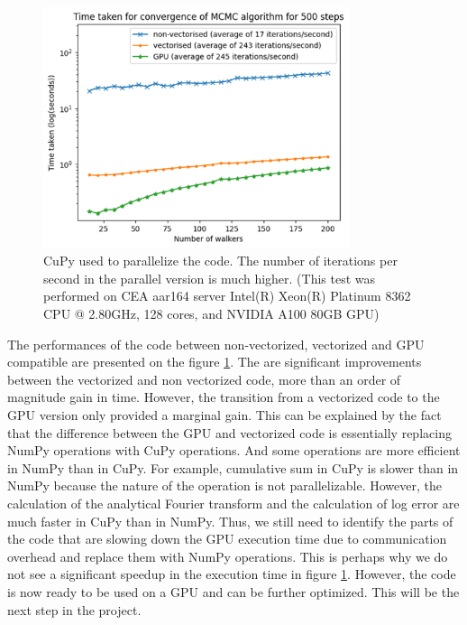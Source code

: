 \begin{figure}[h]
    \centering
    \includegraphics[width=0.8\textwidth]{images/gpu.png}
    \caption{CuPy used to parallelize the code. The number of iterations per second in the parallel version is much higher. (This test was performed 
    on CEA aar164 server Intel(R) Xeon(R) Platinum 8362 CPU @ 2.80GHz, 128 cores, and NVIDIA A100 80GB GPU)}
    \label{fig:cupy}
\end{figure}

\FloatBarrier

The performances of the code between non-vectorized, vectorized and GPU compatible are presented on the figure
\ref{fig:cupy}. The are significant improvements between the vectorized and non vectorized code, more than an order of magnitude gain in time.
However, the transition from a vectorized code to the GPU version only provided a marginal gain.
This can be explained by the fact that the difference between the GPU and vectorized code is essentially replacing NumPy operations with CuPy operations.
And some operations are more efficient in NumPy than in CuPy. For example, cumulative sum in CuPy is slower than in 
NumPy because the nature of the operation is not parallelizable. However, the calculation of the 
analytical Fourier transform and the calculation of log error are much faster in CuPy than in 
NumPy. Thus, we still need to identify the parts of the code that are slowing down the GPU execution 
time due to communication overhead and replace them with NumPy operations. This is perhaps why 
we do not see a significant speedup in the execution time in figure \ref{fig:cupy}. However, the 
code is now ready to be used on a GPU and can be further optimized. This will be the next step 
in the project.

